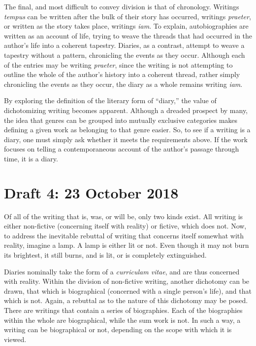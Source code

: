 \documentclass[12pt]{article}[titlepage]
\newcommand{\say}[1]{``#1''}
\newcommand{\1}{\={a}}
\newcommand{\2}{\={e}}
\newcommand{\3}{\={\i}}
\newcommand{\4}{\=o}
\newcommand{\5}{\=u}
\newcommand{\6}{\={A}}
\renewcommand{\,}{\textsuperscript{,}}
\begin{document}
The final, and most difficult to convey division is that of chronology.
Writings \textit{tempus} can be written after the bulk of their story has occurred, writings \textit{praeter}, or written as the story takes place, writings \textit{iam}.
To explain, autobiographies are written as an account of life, trying to weave the threads that had occurred in the author's life into a coherent tapestry.
Diaries, as a contrast, attempt to weave a tapestry without a pattern, chronicling the events as they occur.
Although each of the entries may be writing \textit{praeter}, since the writing is not attempting to outline the whole of the author's history into a coherent thread, rather simply chronicling the events as they occur, the diary as a whole remains writing \textit{iam}.

By exploring the definition of the literary form of \say{diary,} the value of dichotomizing writing becomes apparent.
Although a dreaded prospect by many, the idea that genres can be grouped into mutually exclusive categories makes defining a given work as belonging to that genre easier.
So, to see if a writing is a diary, one must simply ask whether it meets the requirements above.
If the work focuses on telling a contemporaneous account of the author's passage through time, it is a diary. 
 
\section{Draft 4: 23 October 2018}
Of all of the writing that is, was, or will be, only two kinds exist.
All writing is either non-fictive (concerning itself with reality) or fictive, which does not.
Now, to address the inevitable rebuttal of writing that concerns itself somewhat with reality, imagine a lamp.
A lamp is either lit or not.
Even though it may not burn its brightest, it still burns, and is lit, or is completely extinguished.

Diaries nominally take the form of a \textit{curriculam vitae}, and are thus concerned with reality.
Within the division of non-fictive writing, another dichotomy can be drawn, that which is biographical (concerned with a single person's life), and that which is not.
Again, a rebuttal as to the nature of this dichotomy may be posed.
There are writings that contain a series of biographies.
Each of the biographies within the whole are biographical, while the sum work is not.
In such a way, a writing can be biographical or not, depending on the scope with which it is viewed.
\end{document}

